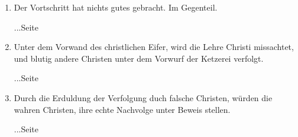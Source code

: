 \begin{enumerate}
 \item Der Vortschritt hat nichts gutes gebracht. Im Gegenteil.
 \begin{flushright}...Seite \pageref{ref:07_14_vortschritt}\end{flushright}
 \item Unter dem Vorwand des christlichen Eifer, wird die Lehre Christi
missachtet, und blutig andere Christen unter dem Vorwurf der Ketzerei verfolgt.
 \begin{flushright}...Seite \pageref{ref:07_14_ketzer}\end{flushright}
 \item Durch die Erduldung der Verfolgung duch falsche Christen, würden die
wahren Christen, ihre echte Nachvolge unter Beweis stellen.
 \begin{flushright}...Seite \pageref{ref:07_16_vervolgung}\end{flushright}
 
\end{enumerate}